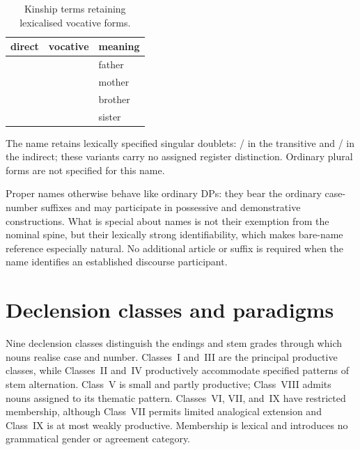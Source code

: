 \begin{table}[ht]
  \footnotesize
  \caption{Kinship terms retaining lexicalised vocative forms.}
  \label{tab:nm-vocative}
  \begin{tabularx}{0.7\textwidth}{L l l}
    \toprule
    {\sc direct} & {\sc vocative} & {\sc meaning} \\
    \midrule
      &   & father \\
      &   & mother \\
     &  & brother \\
      &   & sister \\
    \bottomrule
  \end{tabularx}
\end{table}

The name  retains lexically specified singular doublets:
/ in the transitive and
/ in the indirect; these variants carry no assigned
register distinction. Ordinary plural forms are not specified for this name.

Proper names otherwise behave like ordinary DPs: they bear the ordinary
case-number suffixes and may participate in possessive and demonstrative
constructions. What is special about names is not their exemption from the
nominal spine, but their lexically strong identifiability, which makes
bare-name reference especially natural. No additional article or suffix is
required when the name identifies an established discourse participant.

\FloatBarrier

\section{Declension classes and paradigms}
\label{sec:nm-declension}

Nine declension classes distinguish the endings and stem grades through which
nouns realise case and number. Classes~I and~III are the principal productive
classes, while Classes~II and~IV productively accommodate specified patterns of
stem alternation. Class~V is small and partly productive; Class~VIII admits
nouns assigned to its thematic pattern. Classes~VI, VII, and~IX have restricted
membership, although Class~VII permits limited analogical extension and
Class~IX is at most weakly productive. Membership is lexical and introduces no
grammatical gender or agreement category.

